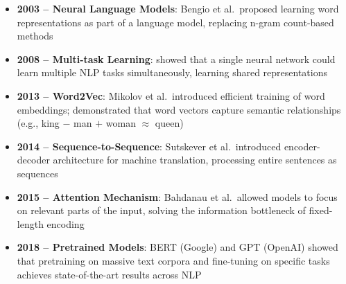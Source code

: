 \documentclass[11pt,a4paper]{article}
\begin{document}
\begin{center}
\end{center}

\begin{itemize}[leftmargin=1.5em]
    \item \textbf{2003 -- Neural Language Models}: Bengio et al.\ proposed learning word representations as part of a language model, replacing n-gram count-based methods
    \item \textbf{2008 -- Multi-task Learning}: showed that a single neural network could learn multiple NLP tasks simultaneously, learning shared representations
    \item \textbf{2013 -- Word2Vec}: Mikolov et al.\ introduced efficient training of word embeddings; demonstrated that word vectors capture semantic relationships (e.g., king $-$ man $+$ woman $\approx$ queen)
    \item \textbf{2014 -- Sequence-to-Sequence}: Sutskever et al.\ introduced encoder-decoder architecture for machine translation, processing entire sentences as sequences
    \item \textbf{2015 -- Attention Mechanism}: Bahdanau et al.\ allowed models to focus on relevant parts of the input, solving the information bottleneck of fixed-length encoding
    \item \textbf{2018 -- Pretrained Models}: BERT (Google) and GPT (OpenAI) showed that pretraining on massive text corpora and fine-tuning on specific tasks achieves state-of-the-art results across NLP
\end{itemize}
\end{document}
